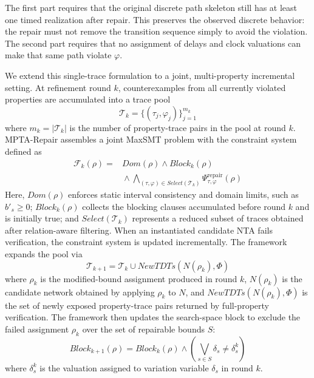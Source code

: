 The first part requires that the original discrete path skeleton still
has at least one timed realization after repair. This preserves the
observed discrete behavior: the repair must not remove the transition
sequence simply to avoid the violation. The second part requires that no
assignment of delays and clock valuations can make that same path
violate $\varphi$.

We extend this single-trace formulation to a joint, multi-property
incremental setting. At refinement round $k$, counterexamples from all
currently violated properties are accumulated into a trace pool
\begin{equation}
  \mathcal{T}_k=\{(\tau_j,\varphi_j)\}_{j=1}^{m_k}
\end{equation}
where $m_k=|\mathcal{T}_k|$ is the number of property-trace pairs in
the pool at round $k$. MPTA-Repair assembles a joint MaxSMT problem with
the constraint system defined as
\begin{equation}
\begin{aligned}
  \mathcal{F}_k(\rho)
  =
  &\mathit{Dom}(\rho)
  \land \mathit{Block}_k(\rho) \\
  &{}\land
  \bigwedge_{(\tau,\varphi)\in \mathit{Select}(\mathcal{T}_k)}
  \Psi_{\tau,\varphi}^{\mathrm{repair}}(\rho)
\end{aligned}
\end{equation}
Here, $\mathit{Dom}(\rho)$ enforces static interval consistency and
domain limits, such as $b'_s\ge 0$; $\mathit{Block}_k(\rho)$ collects
the blocking clauses accumulated before round $k$ and is initially
true; and $\mathit{Select}(\mathcal{T}_k)$ represents a reduced subset
of traces obtained after relation-aware filtering. When an instantiated
candidate NTA fails verification, the constraint system is updated
incrementally. The framework expands the pool via
\begin{equation}
  \mathcal{T}_{k+1}
  =
  \mathcal{T}_k
  \cup
  \mathit{NewTDTs}(N(\rho_k),\Phi)
\end{equation}
where $\rho_k$ is the modified-bound assignment produced in round $k$,
$N(\rho_k)$ is the candidate network obtained by applying $\rho_k$ to
$N$, and $\mathit{NewTDTs}(N(\rho_k),\Phi)$ is the set of newly exposed
property-trace pairs returned by full-property verification. The
framework then updates the search-space block to exclude the failed
assignment $\rho_k$ over the set of repairable bounds $S$:
\begin{equation}
  \mathit{Block}_{k+1}(\rho)
  =
  \mathit{Block}_k(\rho)
  \land
  \left(
    \bigvee_{s\in S} \delta_s \ne \delta_s^k
  \right)
\end{equation}
where $\delta_s^k$ is the valuation assigned to variation variable
$\delta_s$ in round $k$.

